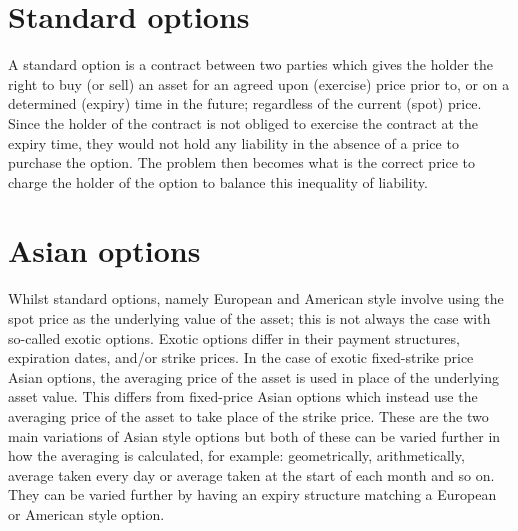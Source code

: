 \section{Standard options}

A standard option is a contract between two parties which gives the holder the right to buy (or sell) an asset for an agreed upon (exercise) price prior to, or on a determined (expiry) time in the future; regardless of the current (spot) price. Since the holder of the contract is not obliged to exercise the contract at the expiry time, they would not hold any liability in the absence of a price to purchase the option. The problem then becomes what is the correct price to charge the holder of the option to balance this inequality of liability. 

\section{Asian options}

Whilst standard options, namely European and American style involve using the spot price as the underlying value of the asset; this is not always the case with so-called exotic options. Exotic options differ in their payment structures, expiration dates, and/or strike prices. In the case of exotic fixed-strike price Asian options, the averaging price of the asset is used in place of the underlying asset value. This differs from fixed-price Asian options which instead use the averaging price of the asset to take place of the strike price. These are the two main variations of Asian style options but both of these can be varied further in how the averaging is calculated, for example: geometrically, arithmetically, average taken every day or average taken at the start of each month and so on. They can be varied further by having an expiry structure matching a European or American style option.